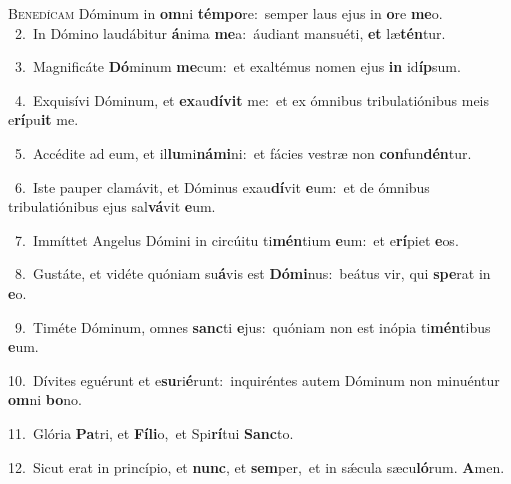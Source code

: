 \lettrine{\initial\textcolor{\initialcolor}{B}}{enedícam} Dóminum in \textbf{om}\-ni \textbf{tém}\-\textbf{po}re:~\star semper laus ejus in \textbf{o}\-re \textbf{me}\-o.\\
{\numbfont\textcolor{\numbcolor}{~2.}}~In Dómino laudábitur \textbf{á}\-nima \textbf{me}\-a:~\star áudiant mansuéti, \textbf{et} læ\-\textbf{tén}\-tur.\par
{\numbfont\textcolor{\numbcolor}{~3.}}~Magnificáte \textbf{Dó}\-minum \textbf{me}\-cum:~\star et exaltémus nomen ejus \textbf{in} id\-\textbf{íp}\-sum.\par
{\numbfont\textcolor{\numbcolor}{~4.}}~Exquisívi Dóminum, et \textbf{ex}\-au\-\textbf{dí}\-\textbf{vit} me:~\star et ex ómnibus tribulatiónibus meis e\-\textbf{rí}\-pu\textbf{it} me.\par
{\numbfont\textcolor{\numbcolor}{~5.}}~Accédite ad eum, et il\-\textbf{lu}\-mi\-\textbf{ná}\-\textbf{mi}ni:~\star et fácies vestræ non \textbf{con}\-fun\-\textbf{dén}\-tur.\par
{\numbfont\textcolor{\numbcolor}{~6.}}~Iste pauper clamávit, et Dóminus exau\-\textbf{dí}\-vit \textbf{e}\-um:~\star et de ómnibus tribulatiónibus ejus sal\-\textbf{vá}\-vit \textbf{e}\-um.\par
{\numbfont\textcolor{\numbcolor}{~7.}}~Immíttet Angelus Dómini in circúitu ti\-\textbf{mén}\-tium \textbf{e}\-um:~\star et e\-\textbf{rí}\-piet \textbf{e}\-os.\par
{\numbfont\textcolor{\numbcolor}{~8.}}~Gustáte, et vidéte quóniam su\-\textbf{á}\-vis est \textbf{Dó}\-\textbf{mi}nus:~\star beátus vir, qui \textbf{spe}\-rat in \textbf{e}\-o.\par
{\numbfont\textcolor{\numbcolor}{~9.}}~Timéte Dóminum, omnes \textbf{sanc}\-ti \textbf{e}\-jus:~\star quóniam non est inópia ti\-\textbf{mén}\-tibus \textbf{e}\-um.\par
{\numbfont\textcolor{\numbcolor}{10.}}~Dívites eguérunt et e\-\textbf{su}\-ri\-\textbf{é}\-runt:~\star inquiréntes autem Dóminum non minuéntur \textbf{om}\-ni \textbf{bo}\-no.\par
{\numbfont\textcolor{\numbcolor}{11.}}~Glória \textbf{Pa}\-tri, et \textbf{Fí}\-\textbf{li}o,~\star et Spi\-\textbf{rí}\-tui \textbf{Sanc}\-to.\par
{\numbfont\textcolor{\numbcolor}{12.}}~Sicut erat in princípio, et \textbf{nunc}\-, et \textbf{sem}\-per,~\star et in sǽcula sæcu\-\textbf{ló}\-rum. \textbf{A}\-men.\par
